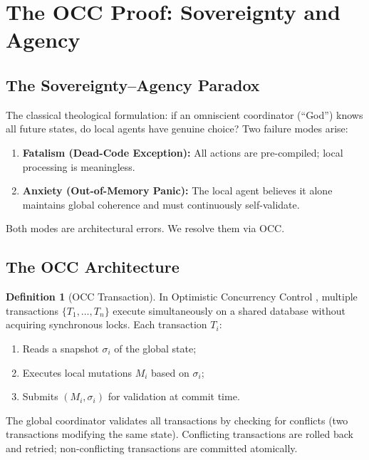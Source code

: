 \documentclass[12pt, a4paper]{article}
\theoremstyle{plain}
\theoremstyle{definition}
\newtheorem{definition}[theorem]{Definition}
\begin{document}
\section{The OCC Proof: Sovereignty and Agency}\label{sec:occ}

\subsection{The Sovereignty--Agency Paradox}

The classical theological formulation: if an omniscient coordinator
(``God'') knows all future states, do local agents have genuine choice?
Two failure modes arise:

\begin{enumerate}[label=(\alph*)]
  \item \textbf{Fatalism (Dead-Code Exception):} All actions are
    pre-compiled; local processing is meaningless.
  \item \textbf{Anxiety (Out-of-Memory Panic):} The local agent believes
    it alone maintains global coherence and must continuously self-validate.
\end{enumerate}

Both modes are architectural errors. We resolve them via OCC.

\subsection{The OCC Architecture}

\begin{definition}[OCC Transaction]\label{def:occ}
  In Optimistic Concurrency Control \citep{Kung1981}, multiple transactions
  $\{T_1, \ldots, T_n\}$ execute simultaneously on a shared database
  without acquiring synchronous locks. Each transaction $T_i$:
  \begin{enumerate}[label=(\roman*)]
    \item Reads a snapshot $\sigma_i$ of the global state;
    \item Executes local mutations $M_i$ based on $\sigma_i$;
    \item Submits $(M_i, \sigma_i)$ for validation at commit time.
  \end{enumerate}
  The global coordinator validates all transactions by checking for
  conflicts (two transactions modifying the same state). Conflicting
  transactions are rolled back and retried; non-conflicting transactions
  are committed atomically.
\end{definition}
\end{document}
